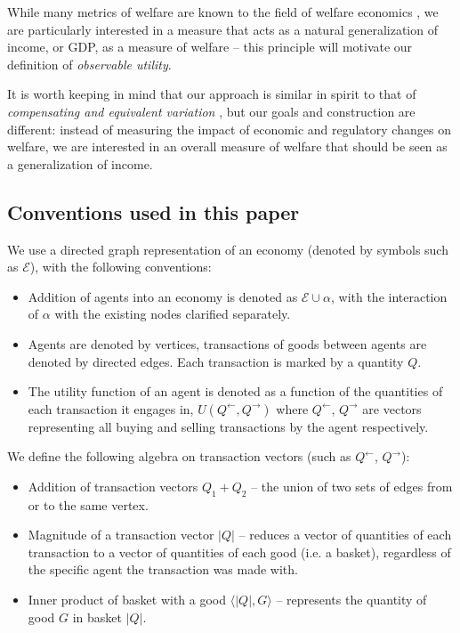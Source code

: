 \documentclass{journal}
\theoremstyle{plain}
\theoremstyle{definition}
\newcommand{\economy}{\ensuremath{\mathcal{E}}}
\begin{document}
While many metrics of welfare are known to the field of welfare economics \cite{eia}, we are particularly interested in a measure that acts as a natural generalization of income, or GDP, as a measure of welfare -- this principle will motivate our definition of \emph{observable utility}. 

It is worth keeping in mind that our approach is similar in spirit to that of \emph{compensating and equivalent variation} \cite{hicks}\cite{tb}, but our goals and construction are different: instead of measuring the impact of economic and regulatory changes on welfare, we are interested in an overall measure of welfare that should be seen as a generalization of income.

\subsection{Conventions used in this paper}
\label{sec:conv}

We use a directed graph representation of an economy (denoted by symbols such as $\economy$), with the following conventions:
\begin{itemize}
    \item Addition of agents into an economy is denoted as $\economy\cup \alpha$, with the interaction of $\alpha$ with the existing nodes clarified separately.
    \item Agents are denoted by vertices, transactions of goods between agents are denoted by directed edges. Each transaction is marked by a quantity $Q$.
    \item The utility function of an agent is denoted as a function of the quantities of each transaction it engages in, $U(Q^\leftarrow, Q^\rightarrow)$ where $Q^\leftarrow$, $Q^\rightarrow$ are vectors representing all buying and selling transactions by the agent respectively.
\end{itemize}

We define the following algebra on transaction vectors (such as $Q^\leftarrow$, $Q^\rightarrow$):
\begin{itemize}
    \item Addition of transaction vectors $Q_1 + Q_2$ -- the union of two sets of edges from or to the same vertex.
    \item Magnitude of a transaction vector $|Q|$ -- reduces a vector of quantities of each transaction to a vector of quantities of each good (i.e. a basket), regardless of the specific agent the transaction was made with.
    \item Inner product of basket with a good $\langle |Q|, G\rangle$ -- represents the quantity of good $G$ in basket $|Q|$.
\end{itemize}
\end{document}
